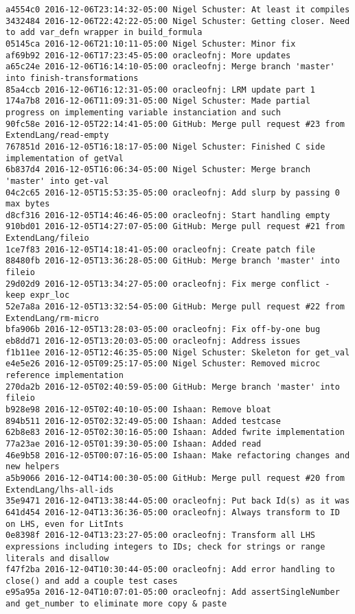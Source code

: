 \begin{lstlisting}
a4554c0 2016-12-06T23:14:32-05:00 Nigel Schuster: At least it compiles
3432484 2016-12-06T22:42:22-05:00 Nigel Schuster: Getting closer. Need to add var_defn wrapper in build_formula
05145ca 2016-12-06T21:10:11-05:00 Nigel Schuster: Minor fix
af69b92 2016-12-06T17:23:45-05:00 oracleofnj: More updates
a65c24e 2016-12-06T16:14:10-05:00 oracleofnj: Merge branch 'master' into finish-transformations
85a4ccb 2016-12-06T16:12:31-05:00 oracleofnj: LRM update part 1
174a7b8 2016-12-06T11:09:31-05:00 Nigel Schuster: Made partial progress on implementing variable instanciation and such
90fc58e 2016-12-05T22:14:41-05:00 GitHub: Merge pull request #23 from ExtendLang/read-empty
767851d 2016-12-05T16:18:17-05:00 Nigel Schuster: Finished C side implementation of getVal
6b837d4 2016-12-05T16:06:34-05:00 Nigel Schuster: Merge branch 'master' into get-val
04c2c65 2016-12-05T15:53:35-05:00 oracleofnj: Add slurp by passing 0 max bytes
d8cf316 2016-12-05T14:46:46-05:00 oracleofnj: Start handling empty
910bd01 2016-12-05T14:27:07-05:00 GitHub: Merge pull request #21 from ExtendLang/fileio
1ce7f83 2016-12-05T14:18:41-05:00 oracleofnj: Create patch file
88480fb 2016-12-05T13:36:28-05:00 GitHub: Merge branch 'master' into fileio
29d02d9 2016-12-05T13:34:27-05:00 oracleofnj: Fix merge conflict - keep expr_loc
52e7a8a 2016-12-05T13:32:54-05:00 GitHub: Merge pull request #22 from ExtendLang/rm-micro
bfa906b 2016-12-05T13:28:03-05:00 oracleofnj: Fix off-by-one bug
eb8dd71 2016-12-05T13:20:03-05:00 oracleofnj: Address issues
f1b11ee 2016-12-05T12:46:35-05:00 Nigel Schuster: Skeleton for get_val
e4e5e26 2016-12-05T09:25:17-05:00 Nigel Schuster: Removed microc reference implementation
270da2b 2016-12-05T02:40:59-05:00 GitHub: Merge branch 'master' into fileio
b928e98 2016-12-05T02:40:10-05:00 Ishaan: Remove bloat
894b511 2016-12-05T02:32:49-05:00 Ishaan: Added testcase
62b8e83 2016-12-05T02:30:16-05:00 Ishaan: Added fwrite implementation
77a23ae 2016-12-05T01:39:30-05:00 Ishaan: Added read
46e9b58 2016-12-05T00:07:16-05:00 Ishaan: Make refactoring changes and new helpers
a5b9066 2016-12-04T14:00:30-05:00 GitHub: Merge pull request #20 from ExtendLang/lhs-all-ids
35e9471 2016-12-04T13:38:44-05:00 oracleofnj: Put back Id(s) as it was
641d454 2016-12-04T13:36:36-05:00 oracleofnj: Always transform to ID on LHS, even for LitInts
0e8398f 2016-12-04T13:23:27-05:00 oracleofnj: Transform all LHS expressions including integers to IDs; check for strings or range literals and disallow
f47f2ba 2016-12-04T10:30:44-05:00 oracleofnj: Add error handling to close() and add a couple test cases
e95a95a 2016-12-04T10:07:01-05:00 oracleofnj: Add assertSingleNumber and get_number to eliminate more copy & paste

\end{lstlisting}
